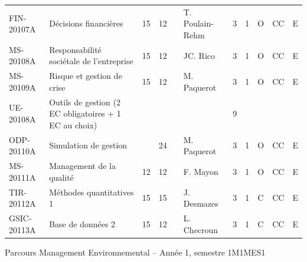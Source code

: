 \documentclass[a4paper,11pt]{article}
\begin{document}
{{\begin{tabular}{lllllllllll}
FIN-20107A    & Décisions financières                                             & 15 & 12 &    & T. Poulain-Rehm & 3    & 1    & O           & CC             & E         \\
MS-20108A     & Responsabilité sociétale de l'entreprise                          & 15 & 12 &    & JC. Rico        & 3    & 1    & O           & CC             & E         \\
MS-20109A     & Risque et gestion de crise                                        & 15 & 12 &    & M. Paquerot     & 3    & 1    & O           & CC             & E         \\
\rowcolor[HTML]{C0C0C0} 
UE-20108A     & Outils de gestion (2 EC obligatoires + 1 EC au choix)             &    &    &    &                 & 9    &      &             &                &           \\
ODP-20110A    & Simulation de gestion                                             &    & 24 &    & M. Paquerot     & 3    & 1    & O           & CC             & E         \\
MS-20111A     & Management de la qualité                                          & 12 & 12 &    & F. Mayon        & 3    & 1    & O           & CC             & E         \\
TIR-20112A    & Méthodes quantitatives 1                                          & 15 & 15 &    & J. Desmazes     & 3    & 1    & C           & CC             & E         \\
GSIC-20113A   & Base de données 2                                                 & 15 & 12 &    & L. Checroun     & 3    & 1    & C           & CC             & E         
\end{tabular}}
}{Parcours Management Environnemental -- Année 1, semestre 1}{M1MES1}
\end{document}
